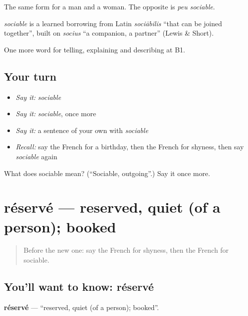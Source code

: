 The same form for a man and a woman. The opposite is \emph{peu sociable}.

\begin{cousinweb}
\emph{sociable} is a learned borrowing from Latin \emph{sociābilis} \textquotedblleft{}that can be joined together\textquotedblright{}, built on \emph{socius} \textquotedblleft{}a companion, a partner\textquotedblright{} (Lewis \& Short).
\end{cousinweb}

\begin{grammarlens}[title={What you've built}]
One more word for telling, explaining and describing at B1.
\end{grammarlens}

\subsection*{Your turn}
\begin{itemize}
\raggedright
  \item \emph{Say it:} \emph{sociable}
  \item \emph{Say it:} \emph{sociable}, once more
  \item \emph{Say it:} a sentence of your own with \emph{sociable}
  \item \emph{Recall:} say the French for a birthday, then the French for shyness, then say \emph{sociable} again
\end{itemize}

\begin{tcolorbox}[breakable,colback=teal!4,colframe=teal!35!black,title={Before you move on}]
What does sociable mean? (\textquotedblleft{}Sociable, outgoing\textquotedblright{}.) Say it once more.
\end{tcolorbox}
\section[réservé]{réservé — reserved, quiet (of a person); booked}

\label{lesson:FR-C466-reserve}



\begin{quote}
Before the new one: say the French for shyness, then the French for sociable.
\end{quote}

\subsection*{You'll want to know: réservé}
\textbf{réservé} — \textquotedblleft{}reserved, quiet (of a person); booked\textquotedblright{}.


